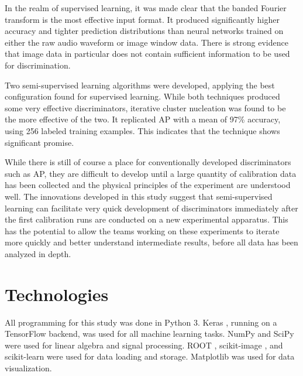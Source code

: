 \documentclass[10pt]{article}
\begin{document}
In the realm of supervised learning, it was made clear that the banded Fourier transform is the most effective input format. It produced significantly higher accuracy and tighter prediction distributions than neural networks trained on either the raw audio waveform or image window data. There is strong evidence that image data in particular does not contain sufficient information to be used for discrimination.

Two semi-supervised learning algorithms were developed, applying the best configuration found for supervised learning. While both techniques produced some very effective discriminators, iterative cluster nucleation was found to be the more effective of the two. It replicated AP with a mean of 97\% accuracy, using 256 labeled training examples. This indicates that the technique shows significant promise.

While there is still of course a place for conventionally developed discriminators such as AP, they are difficult to develop until a large quantity of calibration data has been collected and the physical principles of the experiment are understood well. The innovations developed in this study suggest that semi-supervised learning can facilitate very quick development of discriminators immediately after the first calibration runs are conducted on a new experimental apparatus. This has the potential to allow the teams working on these experiments to iterate more quickly and better understand intermediate results, before all data has been analyzed in depth.

\section{Technologies}

All programming for this study was done in Python 3. Keras \cite{keras}, running on a TensorFlow backend, was used for all machine learning tasks. NumPy \cite{numpy} and SciPy \cite{scipy} were used for linear algebra and signal processing. ROOT \cite{root}, scikit-image \cite{scikit-image}, and scikit-learn \cite{scikit-learn} were used for data loading and storage. Matplotlib \cite{matplotlib} was used for data visualization.

\printbibliography
\end{document}
